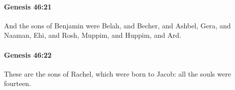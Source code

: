 		\paragraph{Genesis 46:21} %
			\label{GENESIS-46-21}

			And the sons of Benjamin were Belah, and Becher, and Ashbel, Gera, and Naaman, Ehi, and Rosh, Muppim, and Huppim, and Ard.


		\paragraph{Genesis 46:22} %
			\label{GENESIS-46-22}

			These are the sons of Rachel, which were born to Jacob: all the souls were fourteen.


